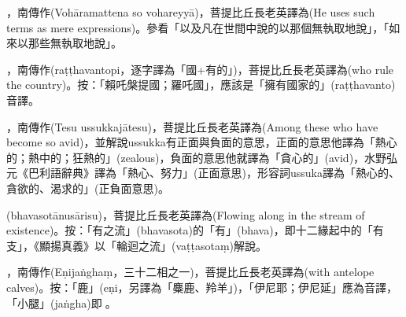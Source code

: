 \startitemgroup[noteitems]
\item{}，南傳作(Vohāramattena so vohareyyā)，菩提比丘長老英譯為(He uses such terms as mere expressions)。參看「以及凡在世間中說的以那個無執取地說」，「如來以那些無執取地說」。
\stopitemgroup

\startitemgroup[noteitems]
\item{}，南傳作(raṭṭhavantopi，逐字譯為「國+有的」)，菩提比丘長老英譯為(who rule the country)。按：「賴吒槃提國；羅吒國」，應該是「擁有國家的」(raṭṭhavanto)音譯。
\stopitemgroup

\startitemgroup[noteitems]
\item{}，南傳作(Tesu ussukkajātesu)，菩提比丘長老英譯為(Among these who have become so avid)，並解說ussukka有正面與負面的意思，正面的意思他譯為「熱心的；熱中的；狂熱的」(zealous)，負面的意思他就譯為「貪心的」(avid)，水野弘元《巴利語辭典》譯為「熱心、努力」(正面意思)，形容詞ussuka譯為「熱心的、貪欲的、渴求的」(正負面意思)。
\stopitemgroup

\startitemgroup[noteitems]
\item{}(bhavasotānusārisu)，菩提比丘長老英譯為(Flowing along in the stream of existence)。按：「有之流」(bhavasota)的「有」(bhava)，即十二緣起中的「有支」，《顯揚真義》以「輪迴之流」(vaṭṭasotaṃ)解說。
\stopitemgroup

\startitemgroup[noteitems]
\item{}，南傳作(Eṇijaṅghaṃ，三十二相之一)，菩提比丘長老英譯為(with antelope calves)。按：「鹿」(eṇi，另譯為「麋鹿、羚羊」)，「伊尼耶；伊尼延」應為音譯，「小腿」(jaṅgha)即𨄔。
\stopitemgroup

